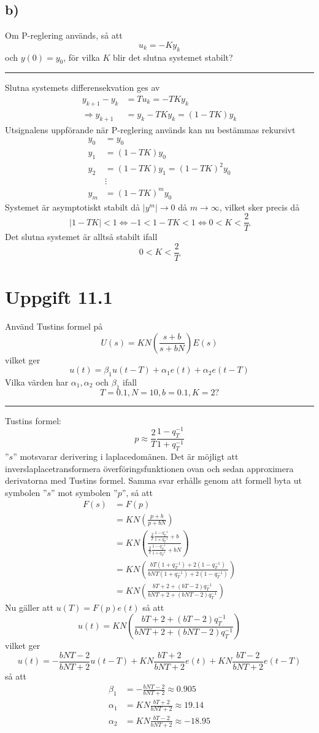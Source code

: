 \documentclass[12pt]{article}
\newcommand{\qline}{\hrule \vspace*{10pt}}
\begin{document}
\subsection*{b)}
Om P-reglering används, så att 
\[u_k = -Ky_k\]
och $y(0) = y_0$, för vilka $K$ blir det slutna systemet stabilt?
\qline
Slutna systemets differensekvation ges av
\begin{align*}
  y_{k+1} - y_k &= Tu_k = -TKy_k \\
  \Rightarrow y_{k+1} &= y_k - TKy_k = (1-TK)y_k
\end{align*}
Utsignalens uppförande när P-reglering används kan nu bestämmas rekursivt
\begin{align*}
  y_0 &= y_0 \\
  y_1 &= (1-TK)y_0 \\
  y_2 &= (1-TK)y_1 = (1-TK)^2 y_0 \\
  &\vdots \\
  y_m &= (1-TK)^m y_0
\end{align*}
Systemet är asymptotiskt stabilt då $|y^m| \to 0$ då $m \to \infty$, vilket sker precis då 
\[|1-TK| < 1 \Leftrightarrow -1 < 1-TK < 1 \Leftrightarrow 0 < K < \frac{2}{T}\]
Det slutna systemet är alltså stabilt ifall 
\[0 < K < \frac{2}{T}\]

\section*{Uppgift 11.1}
Använd Tustins formel på 
\[U(s) = KN 
\left(
  \frac{s+b}{s+bN}
\right)E(s)\]
vilket ger 
\[u(t) = \beta_1 u(t-T) + \alpha_1 e(t) + \alpha_2 e(t-T)\]
Vilka värden har $\alpha_1, \alpha_2$ och $\beta_1$ ifall 
\[T = 0.1, N = 10, b = 0.1, K = 2?\]
\qline
Tustins formel: 
\[p \approx \frac{2}{T} \frac{1 - q_T^{-1}}{1 + q_T^{-1}}\]
''$s$'' motsvarar derivering i laplacedomänen. Det är möjligt att inverslaplacetransformera överföringsfunktionen ovan och sedan approximera derivatorna med Tustins formel. Samma svar erhålls genom att formell byta ut symbolen ''$s$'' mot symbolen ''$p$'', så att
\begin{align*}
  F(s) &= F(p) \\
  &= KN 
    \left(
    \frac{p+b}{p+bN}
    \right) \\
  &= KN 
    \left(
    \frac{\frac{2}{T} \frac{1-q_T^{-1}}{1+q_T^{-1}}+b}{\frac{2}{T} \frac{1-q_T^{-1}}{1+q_T^{-1}}+bN}
    \right) \\
  &= KN 
    \left(
    \frac{bT(1+q_T^{-1}) + 2(1-q_T^{-1})}{bNT(1+q_T^{-1}) + 2(1-q_T^{-1})}
    \right) \\
  &= KN 
    \left(
    \frac{bT+2 + (bT-2)q_T^{-1}}{bNT+2+(bNT-2)q_T^{-1}}
    \right)
\end{align*}
Nu gäller att $u(T) = F(p)e(t)$ så att 
\[u(t) = KN 
    \left(
    \frac{bT+2 + (bT-2)q_T^{-1}}{bNT+2+(bNT-2)q_T^{-1}}
    \right)\]
vilket ger 
\[u(t) = -\frac{bNT-2}{bNT+2}u(t-T) + KN \frac{bT+2}{bNT+2}e(t) + KN \frac{bT-2}{bNT+2}e(t-T)\]
så att
\begin{align*}
  \beta_1 &= -\frac{bNT-2}{bNT+2} \approx 0.905 \\
  \alpha_1 &= KN \frac{bT+2}{bNT+2} \approx 19.14 \\
  \alpha_2 &= KN \frac{bT-2}{bNT+2} \approx -18.95
\end{align*}
\end{document}
